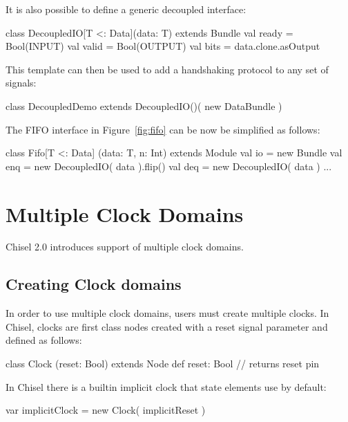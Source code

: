 \documentclass[twocolumn,10pt]{article}
\begin{document}
It is also possible to define a generic decoupled interface:

\begin{scala}
class DecoupledIO[T <: Data](data: T) 
    extends Bundle {
  val ready = Bool(INPUT)
  val valid = Bool(OUTPUT)
  val bits  = data.clone.asOutput
}
\end{scala}

\noindent
This template can then be used to add a handshaking protocol to any
set of signals:

\begin{scala}
class DecoupledDemo 
  extends DecoupledIO()( new DataBundle )
\end{scala}

\noindent
The FIFO interface in Figure~\ref{fig:fifo} can be now be simplified as
follows: 

\begin{scala}
class Fifo[T <: Data] (data: T, n: Int) 
    extends Module {
  val io = new Bundle {
    val enq = new DecoupledIO( data ).flip()
    val deq = new DecoupledIO( data )
  }
  ...
}
\end{scala}


\section{Multiple Clock Domains}

Chisel 2.0 introduces support of multiple clock domains.  

\subsection{Creating Clock domains}

In order to use multiple clock domains, users must create multiple clocks.  
In Chisel, clocks are first class nodes created with a reset signal parameter and defined as follows:

\begin{scala}
class Clock (reset: Bool) extends Node {
  def reset: Bool // returns reset pin
}
\end{scala}

\noindent
In Chisel there is a builtin implicit clock that state elements use by default:

\begin{scala}
var implicitClock = new Clock( implicitReset )
\end{scala}
\end{document}
